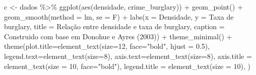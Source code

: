 \documentclass[
]{article}
\newenvironment{Shaded}{\begin{snugshade}}{\end{snugshade}}
\newcommand{\AttributeTok}[1]{\textcolor[rgb]{0.77,0.63,0.00}{#1}}
\newcommand{\DecValTok}[1]{\textcolor[rgb]{0.00,0.00,0.81}{#1}}
\newcommand{\FloatTok}[1]{\textcolor[rgb]{0.00,0.00,0.81}{#1}}
\newcommand{\FunctionTok}[1]{\textcolor[rgb]{0.00,0.00,0.00}{#1}}
\newcommand{\NormalTok}[1]{#1}
\newcommand{\OtherTok}[1]{\textcolor[rgb]{0.56,0.35,0.01}{#1}}
\newcommand{\SpecialCharTok}[1]{\textcolor[rgb]{0.00,0.00,0.00}{#1}}
\newcommand{\StringTok}[1]{\textcolor[rgb]{0.31,0.60,0.02}{#1}}
\begin{document}
\begin{Shaded}
\begin{Highlighting}[]
\NormalTok{c }\OtherTok{\textless{}{-}}\NormalTok{ dados }\SpecialCharTok{\%\textgreater{}\%} 
  \FunctionTok{ggplot}\NormalTok{(}\FunctionTok{aes}\NormalTok{(densidade, crime\_burglary)) }\SpecialCharTok{+}
  \FunctionTok{geom\_point}\NormalTok{() }\SpecialCharTok{+} 
  \FunctionTok{geom\_smooth}\NormalTok{(}\AttributeTok{method =} \StringTok{\textquotesingle{}lm\textquotesingle{}}\NormalTok{, }\AttributeTok{se =}\NormalTok{ F) }\SpecialCharTok{+}
  \FunctionTok{labs}\NormalTok{(}\AttributeTok{x =} \StringTok{\textquotesingle{}Densidade\textquotesingle{}}\NormalTok{,}
       \AttributeTok{y =} \StringTok{\textquotesingle{}Taxa de burglary\textquotesingle{}}\NormalTok{,}
       \AttributeTok{title =} \StringTok{\textquotesingle{}Relação entre densidade e taxa de burglary\textquotesingle{}}\NormalTok{,}
       \AttributeTok{caption =} \StringTok{\textquotesingle{}Construido com base em Donohue e Ayres (2003)\textquotesingle{}}\NormalTok{) }\SpecialCharTok{+} 
  \FunctionTok{theme\_minimal}\NormalTok{() }\SpecialCharTok{+}
  \FunctionTok{theme}\NormalTok{(}\AttributeTok{plot.title=}\FunctionTok{element\_text}\NormalTok{(}\AttributeTok{size=}\DecValTok{12}\NormalTok{, }\AttributeTok{face=}\StringTok{"bold"}\NormalTok{, }\AttributeTok{hjust =} \FloatTok{0.5}\NormalTok{),}
        \AttributeTok{legend.text=}\FunctionTok{element\_text}\NormalTok{(}\AttributeTok{size=}\DecValTok{8}\NormalTok{),}
        \AttributeTok{axis.text=}\FunctionTok{element\_text}\NormalTok{(}\AttributeTok{size=}\DecValTok{8}\NormalTok{),}
        \AttributeTok{axis.title =} \FunctionTok{element\_text}\NormalTok{(}\AttributeTok{size =} \DecValTok{10}\NormalTok{, }\AttributeTok{face=}\StringTok{"bold"}\NormalTok{),}
        \AttributeTok{legend.title =} \FunctionTok{element\_text}\NormalTok{(}\AttributeTok{size =} \DecValTok{10}\NormalTok{),}
\NormalTok{        )}


\end{Highlighting}
\end{Shaded}
\end{document}

